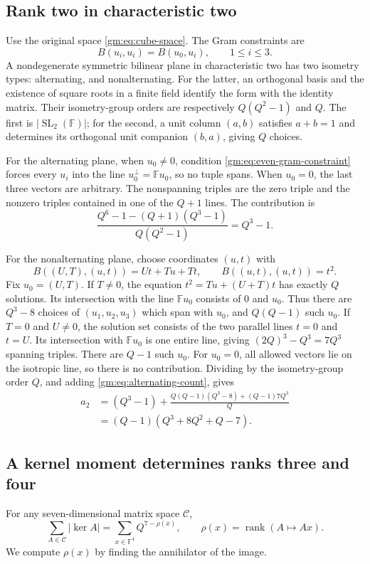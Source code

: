 \documentclass[11pt,a4paper]{article}
\numberwithin{equation}{section}
\theoremstyle{definition}
\theoremstyle{remark}
\newcommand{\F}{\mathbb F}
\newcommand{\1}{\mathbf 1}
\newcommand{\rank}{\operatorname{rank}}
\begin{document}
\subsection{Rank two in characteristic two}
Use the original space \eqref{gm:eq:cube-space}. The Gram constraints are
\begin{equation}\label{gm:eq:even-gram-constraint}
 B(u_i,u_i)=B(u_0,u_i),\qquad 1\leq i\leq3.
\end{equation}
A nondegenerate symmetric bilinear plane in characteristic two has two
isometry types: alternating, and nonalternating. For the latter, an
orthogonal basis and the existence of square roots in a finite field
identify the form with the identity matrix. Their isometry-group orders
are respectively $Q(Q^2-1)$ and $Q$. The first is
$|\operatorname{SL}_2(\F)|$; for the second, a unit column $(a,b)$ satisfies
$a+b=1$ and determines its orthogonal unit companion $(b,a)$, giving $Q$
choices.

For the alternating plane, when $u_0\ne0$, condition
\eqref{gm:eq:even-gram-constraint} forces every $u_i$ into the line
$u_0^\perp=\F u_0$, so no tuple spans. When $u_0=0$, the last three vectors
are arbitrary. The nonspanning triples are the zero triple and the
nonzero triples contained in one of the $Q+1$ lines. The contribution is
\begin{equation}\label{gm:eq:alternating-count}
 \frac{Q^6-1-(Q+1)(Q^3-1)}{Q(Q^2-1)}=Q^3-1.
\end{equation}

For the nonalternating plane, choose coordinates $(u,t)$ with
\[
 B((U,T),(u,t))=Ut+Tu+Tt,\qquad B((u,t),(u,t))=t^2.
\]
Fix $u_0=(U,T)$. If $T\ne0$, the equation
$t^2=Tu+(U+T)t$ has exactly $Q$ solutions. Its intersection with the line
$\F u_0$ consists of $0$ and $u_0$. Thus there are $Q^3-8$ choices of
$(u_1,u_2,u_3)$ which span with $u_0$, and $Q(Q-1)$ such $u_0$.
If $T=0$ and $U\ne0$, the solution set consists of the two parallel lines
$t=0$ and $t=U$. Its intersection with $\F u_0$ is one entire line, giving
$(2Q)^3-Q^3=7Q^3$ spanning triples. There are $Q-1$ such $u_0$.
For $u_0=0$, all allowed vectors lie on the isotropic line, so there is
no contribution. Dividing by the isometry-group order $Q$, and adding
\eqref{gm:eq:alternating-count}, gives
\begin{align*}
 a_2&=(Q^3-1)
    +\frac{Q(Q-1)(Q^3-8)+(Q-1)7Q^3}{Q}\\
    &=(Q-1)(Q^3+8Q^2+Q-7).
\end{align*}

\subsection{A kernel moment determines ranks three and four}
For any seven-dimensional matrix space $\mathcal C$,
\begin{equation}\label{gm:eq:kernel-double-count}
 \sum_{A\in\mathcal C}|\ker A|
     =\sum_{x\in\F^4}Q^{7-\rho(x)},
 \qquad \rho(x)=\rank(A\mapsto Ax).
\end{equation}
We compute $\rho(x)$ by finding the annihilator of the image.
\end{document}
